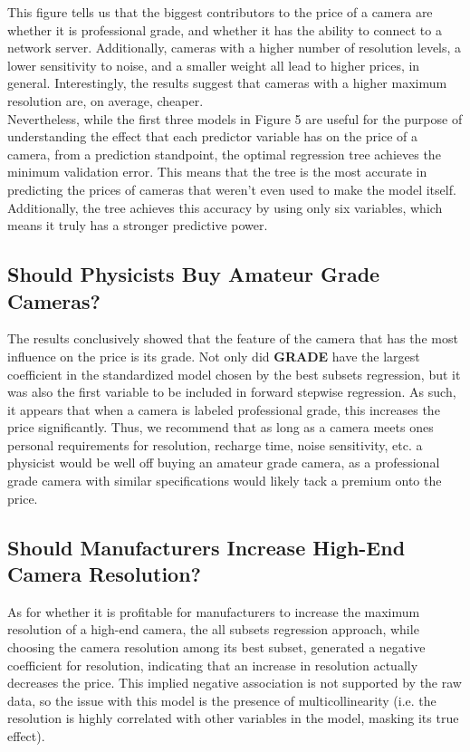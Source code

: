 \documentclass[12pt]{article}
\begin{document}
This figure tells us that the biggest contributors to the price of a camera are whether it is professional grade, and whether it has the ability to connect to a network server. Additionally, cameras with a higher number of resolution levels, a lower sensitivity to noise, and a smaller weight all lead to higher prices, in general. Interestingly, the results suggest that cameras with a higher maximum resolution are, on average, cheaper.\\

Nevertheless, while the first three models in Figure 5 are useful for the purpose of understanding the effect that each predictor variable has on the price of a camera, from a prediction standpoint, the optimal regression tree achieves the minimum validation error. This means that the tree is the most accurate in predicting the prices of cameras that weren't even used to make the model itself. Additionally, the tree achieves this accuracy by using only six variables, which means it truly has a stronger predictive power.

\subsection{Should Physicists Buy Amateur Grade Cameras?}
The results conclusively showed that the feature of the camera that has the most influence on the price is its grade. Not only did {\bf GRADE} have the largest coefficient in the standardized model chosen by the best subsets regression, but it was also the first variable to be included in forward stepwise regression. As such, it appears that when a camera is labeled professional grade, this increases the price significantly. Thus, we recommend that as long as a camera meets ones personal requirements for resolution, recharge time, noise sensitivity, etc. a physicist would be well off buying an amateur grade camera, as a professional grade camera with similar specifications would likely tack a premium onto the price.

\subsection{Should Manufacturers Increase High-End Camera Resolution?}
As for whether it is profitable for manufacturers to increase the maximum resolution of a high-end camera, the all subsets regression approach, while choosing the camera resolution among its best subset, generated a negative coefficient for resolution, indicating that an increase in resolution actually decreases the price. This implied negative association is not supported by the raw data, so the issue with this model is the presence of multicollinearity (i.e. the resolution is highly correlated with other variables in the model, masking its true effect).\\
\end{document}
